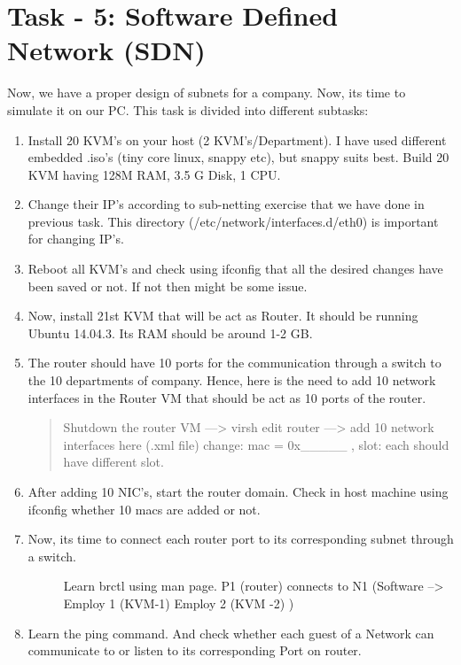 \documentclass[letterpaper,10pt,english]{sphinxmanual}
\begin{document}
\section{Task - 5: Software Defined Network (SDN)}
\label{week-03:task-5-software-defined-network-sdn}
Now, we have a proper design of subnets for a company. Now, its time to simulate it on our PC. This task is divided into different subtasks:
\begin{enumerate}
\item {} 
Install 20 KVM's on your host (2 KVM's/Department). I have used different embedded .iso's (tiny core linux, snappy etc), but snappy suits best. Build 20 KVM having 128M RAM, 3.5 G Disk, 1 CPU.

\item {} 
Change their IP's according to sub-netting exercise that we have done in previous task. This directory (/etc/network/interfaces.d/eth0) is important for changing IP's.

\item {} 
Reboot all KVM's and check using ifconfig that all the desired changes have been saved or not. If not then might be some issue.

\item {} 
Now, install 21st  KVM that will be act as Router. It should be running Ubuntu 14.04.3. Its RAM should be around 1-2 GB.

\item {} 
The router should have 10 ports for the communication through a switch to the 10 departments of company. Hence, here is the need to add 10 network interfaces in the Router VM that should be act as 10 ports of the router.
\begin{quote}

Shutdown the router VM ---\textgreater{} virsh edit router ---\textgreater{} add 10 network interfaces here (.xml file)
change:  mac = 0x\_\_\_\_\_ , slot: each should have different slot.
\end{quote}

\item {} 
After adding 10 NIC's, start the router domain. Check in host machine using ifconfig  whether 10 macs are added or not.

\item {} \begin{description}
\item[{Now, its time to connect each router port to its corresponding subnet through a switch.}] \leavevmode
Learn brctl using man page.
P1 (router) connects to N1 (Software  –\textgreater{}  Employ 1 (KVM-1) Employ 2 (KVM -2) )

\end{description}

\item {} 
Learn the ping command. And check whether each guest of a Network can communicate to or listen to its corresponding Port on router.

\end{enumerate}
\end{document}

